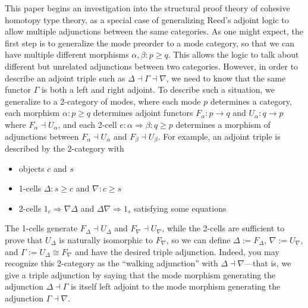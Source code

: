\documentclass{drl-common/llncs}
\newcommand{\la}{\ensuremath{\dashv}}
\newcommand{\tc}[2]{\ensuremath{#1 \Rightarrow #2}}
\begin{document}
This paper begins an investigation into the structural proof theory of
cohesive homotopy type theory, as a special case of generalizing Reed's
adjoint logic to allow multiple adjunctions between the same categories.
As one might expect, the first step is to generalize the mode preorder
to a mode category, so that we can have multiple different morphisms
$\alpha, \beta : p\ge q$.  This allows the logic to talk about different
but unrelated adjunctions between two categories.  However, in order to
describe an adjoint triple such as $\Delta \la \Gamma \la \nabla$, we
need to know that the same functor $\Gamma$ is both a left and right
adjoint.  To describe such a situation, we generalize to a 2-category of
modes, where each mode $p$ determines a category, each morphism $\alpha
: p \ge q$ determines adjoint functors $F_\alpha : p \to q$ and
$U_\alpha : q \to p$ where $F_\alpha \la U_\alpha$, and each 2-cell $e :
\tc \alpha  \beta : q \ge p$ determines a morphism of adjunctions between 
$F_\alpha \la U_\alpha$ and $F_\beta \la U_\beta$.  For example, an
adjoint triple is described by the 2-category with
\begin{itemize}
\item objects $c$ and $s$
\item 1-cells $\Delta : s \ge c$ and $\nabla : c \ge s$
\item 2-cells $\tc {1_c} {\nabla \Delta}$ 
and $\tc {\Delta \nabla} {1_s}$ satisfying 
some equations
\end{itemize}
The 1-cells generate $F_\Delta \la U_\Delta$ and $F_\nabla \la
U_\nabla$, while the 2-cells are sufficient to prove that $U_\Delta$ is
naturally isomorphic to $F_\nabla$, so we can define $\Delta :=
F_\Delta$, $\nabla := U_\nabla$, and $\Gamma := U_\Delta \cong F_\nabla$
and have the desired triple adjunction.  Indeed, you may recognize this
2-category as the ``walking adjunction'' with $\Delta \la \nabla$---that
is, we give a triple adjunction by saying that the mode morphism generating
the adjunction $\Delta\la \Gamma$ is itself left adjoint to the mode morphism generating the
adjunction $\Gamma\la\nabla$.
\end{document}
